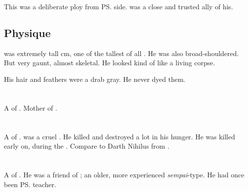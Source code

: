 This was a deliberate ploy from \ps{\Azraid} side. 
\Harbeth{} was a close and trusted ally of his. 









\subsection{Physique}
\Harbeth{} was extremely tall cm, one of the tallest of all \resphain.
He was also broad-shouldered.
But very gaunt, almost skeletal. 
He looked kind of like a living corpse. 

His hair and feathers were a drab gray.
He never dyed them.















\section{\Jeshred}
\index{\Jeshred} 
A \thelyad{} \resvil{} of \CiriathSepher.
Mother of \Zereth. 















\section{\Mehaloch}
\index{\Mehaloch}
A \sathariah of \CiriathSepher. 
\Mehaloch was a cruel .
He killed and destroyed a lot in his hunger.
He was killed early on, during the \secondbanewar.
Compare to Darth Nihilus from \cite{VideoGame:KOTORII}.















\section{\Menessiaraid}
\index{\Menessiaraid}
A \ketheran{} \resphan{} of \CiriathSepher. 
He was a friend of ; an older, more experienced \emph{sempai}-type. 
He had once been \ps{\Teshrial} teacher. 









